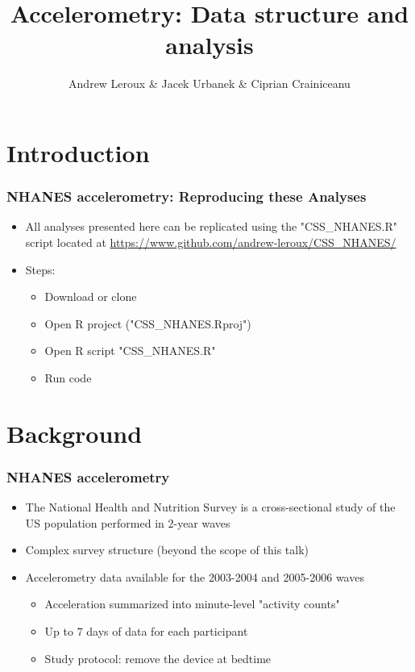 \documentclass[10pt]{beamer}\usepackage[]{graphicx}\usepackage[]{color}
\newcommand\makebeamertitle{\frame{\maketitle}}%
\begin{document}
\title[]{Accelerometry: Data structure and analysis}
\author[]{Andrew Leroux \& Jacek Urbanek \& Ciprian Crainiceanu}
\makebeamertitle





\section{Introduction}

\begin{frame}
\frametitle{NHANES accelerometry: Reproducing these Analyses}
\begin{itemize}
\item All analyses presented here can be replicated using the "CSS\_NHANES.R" script located at 
\url{https://www.github.com/andrew-leroux/CSS_NHANES/}
\item Steps:
    \begin{itemize}
    \item Download or clone
    \item Open R project ("CSS\_NHANES.Rproj")
    \item Open R script "CSS\_NHANES.R"
    \item Run code
    \end{itemize}
\end{itemize}
\end{frame}


\section{Background}


\begin{frame}
\frametitle{NHANES accelerometry}
\begin{itemize}
\item The National Health and Nutrition Survey is a cross-sectional study of the US population performed in 2-year waves
\item Complex survey structure (beyond the scope of this talk)
\item Accelerometry data available for the 2003-2004 and 2005-2006 waves
    \begin{itemize}
    \item Acceleration summarized into minute-level "activity counts"
    \item Up to 7 days of data for each participant
    \item Study protocol: remove the device at bedtime 
    \end{itemize}
\end{itemize}
\end{frame}
\end{document}
